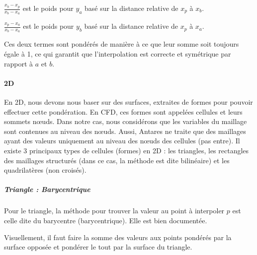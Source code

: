         \( \frac{x_b - x_p}{x_b - x_a} \) est le poids pour \( y_a \) basé sur la distance relative de \( x_p \) à \( x_b \).

        \( \frac{x_p - x_a}{x_b - x_a} \) est le poids pour \( y_b \) basé sur la distance relative de \( x_p \) à \( x_a \).\vspace{0.5cm}

Ces deux termes sont pondérés de manière à ce que leur somme soit toujours égale à 1, ce
qui garantit que l'interpolation est correcte et symétrique par rapport à \( a \) et \( b \).\vspace{0.5cm}


\paragraph{2D}

\vspace{0.5cm}

En 2D, nous devons nous baser sur des surfaces, extraites de formes pour pouvoir effectuer cette pondération. En CFD, ces formes sont appelées cellules et leurs sommets nœuds. Dans notre cas, nous considérons que les variables du maillage sont contenues au niveau des nœuds. Aussi, Antares ne traite que des maillages ayant des valeurs uniquement au niveau des nœuds des cellules (pas entre).
Il existe 3 principaux types de cellules (formes) en 2D : les triangles, les rectangles des maillages structurés (dans ce cas, la méthode est dite bilinéaire) et les quadrilatères (non croisés).

\subparagraph{Triangle : Barycentrique}

Pour le triangle, la méthode pour trouver la valeur au point à interpoler \( p \) est celle dite du barycentre (barycentrique).
Elle est bien documentée.

Visuellement, il faut faire la somme des valeurs aux points pondérés par la surface opposée et pondérer le tout par la surface du triangle.

